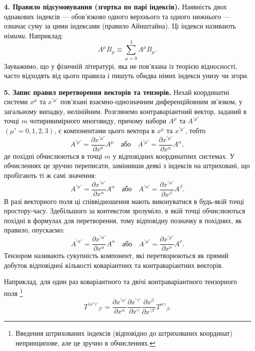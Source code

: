 \documentclass[%
biblatex,
]{ConspectBook}
\begin{document}
\textbf{4. Правило підсумовування (згортка по парі індексів).}
Наявність двох однакових індексів --- обов'язково одного верхнього та
одного нижнього --- означає суму за цими індексами (правило Айнштайна).
Ці індекси називають \textit{німими}. Наприклад:
\[
  A^\mu B_\mu \equiv \sum_{\mu=0}^{3} A^\mu B_\mu.
\]
Зауважимо, що у фізичній літературі, яка не пов'язана із
теорією відносності, часто відходять від цього правила і пишуть обидва
німих індекси унизу чи згори.

\textbf{5. Запис правил перетворення векторів та тензорів.}
Нехай координатні системи $x^\mu$ та $x^{\prime\mu'}$ пов'язані
взаємно-однозначним диференційовним зв'язком, у загальному випадку,
нелінійним. Розглянемо контраваріантний вектор, заданий в точці $m$
чотиривимірного многовиду, причому набори $A^\mu$ та $A^{\prime\mu'}$
$(\mu' = 0,1,2,3)$, є компонентами цього вектора в $x^\mu$ та
$x^{\prime\mu'}$, тобто
\[
  A^{\prime\mu'} = \frac{\partial x^{\prime\mu'}}{\partial x^\mu} A^\mu
  \quad\text{або}\quad
  A^{\prime\mu'} = \frac{\partial x^{\prime\mu'}}{\partial x^\alpha} A^\alpha,
\]
де похідні обчислюються в точці $m$ у відповідних координатних
системах. У обчисленнях це зручно переписати, замінивши деякі з індексів
на штриховані, що пробігають ті ж самі значення:
\[
  A^{\prime\alpha'} = \frac{\partial x^{\prime\alpha'}}{\partial x^\alpha} A^\alpha
  \quad\text{або}\quad
  A^{\prime\alpha'} = \frac{\partial x^{\prime\alpha'}}{\partial x^\beta} A^\beta.
\]
В разі векторного поля ці співвідношення мають виконуватися в будь-якій
точці простору-часу. Здебільшого за контекстом зрозуміло, в якій точці
обчислюються похідні в формулах для перетворення, тому відповідну
позначку в похідних, як правило, опускаємо:
\[
  A^{\prime\alpha'} = \frac{\partial x^{\prime\alpha'}}{\partial x^\alpha} A^\alpha
  \quad\text{або}\quad
  A^{\prime\mu'} = \frac{\partial x^{\prime\mu'}}{\partial x^\nu} A^\nu.
\]
Тензором називають сукупність компонент, які перетворюються як прямий
добуток відповідної кількості коваріантних та контраваріантних векторів.

Наприклад, для один раз коваріантного та двічі контраваріантного
тензорного поля%
\footnote{Введення штрихованих індексів (відповідно до
штрихованих координат) непринципове, але це зручно в обчисленнях.}
\[
  T^{\prime\alpha'\gamma'}{}_{\beta'} =
    \frac{\partial x^{\prime\alpha'}}{\partial x^\alpha}
    \frac{\partial x^{\prime\gamma'}}{\partial x^\gamma}
    \frac{\partial x^\beta}{\partial x^{\prime\beta'}}
    T^{\alpha\gamma}{}_\beta.
\]
\end{document}
